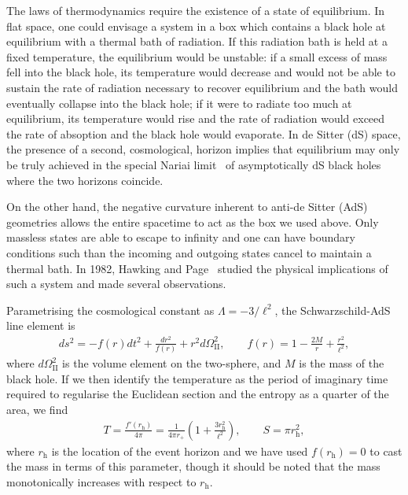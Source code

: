 \documentclass[
twoside,
openright,
frontopenright,
]{dmathesis}
\begin{document}
The laws of thermodynamics require the existence of a state of equilibrium. In
flat space, one could envisage a system in a box which contains a black hole at
equilibrium with a thermal bath of radiation. If this radiation bath is held at
a fixed temperature, the equilibrium would be unstable: if a small excess of
mass fell into the black hole, its temperature would decrease and would not be
able to sustain the rate of radiation necessary to recover equilibrium and the
bath would eventually collapse into the black hole; if it were to radiate too
much at equilibrium, its temperature would rise and the rate of radiation would
exceed the rate of absoption and the black hole would evaporate. In de Sitter
(dS) space, the presence of a second, cosmological, horizon implies that
equilibrium may only be truly achieved in the special Nariai
limit~\cite{Nariai:1950aa,Nariai:1951aa} of asymptotically dS black holes where
the two horizons coincide.

On the other hand, the negative curvature inherent to anti-de Sitter (AdS)
geometries allows the entire spacetime to act as the box we used above. Only
massless states are able to escape to infinity and one can have boundary
conditions such than the incoming and outgoing states cancel to maintain a
thermal bath. In 1982, Hawking and Page~\cite{Hawking:1982dh} studied the
physical implications of such a system and made several observations.

Parametrising the cosmological constant as $\Lambda = -3/\ell^2$, the
Schwarzschild-AdS line element is
\begin{gather}
  ds^2 = -f(r)dt^2 + \frac{dr^2}{f(r)} + r^2 d\Omega_{\mathrm{II}}^2, \qquad
  f(r) = 1-\frac{2M}{r}+\frac{r^2}{\ell^2},
  \label{eq:schwAdS}
\end{gather}
where $d\Omega_\mathrm{II}^2$ is the volume element on the two-sphere, and $M$
is the mass of the black hole. If we then identify the temperature as the period
of imaginary time required to regularise the Euclidean section and the entropy
as a quarter of the area, we find
\begin{align}
  T = \frac{f'(r_\mathrm{h})}{4\pi} = \frac{1}{4\pi
    r_+}\left(1+\frac{3r_\mathrm{h}^2}{\ell^2}\right), \qquad S = \pi r_\mathrm{h}^2,
\end{align}
where $r_\mathrm{h}$ is the location of the event horizon and we have used
$f(r_\mathrm{h})=0$ to cast the mass in terms of this parameter, though it
should be noted that the mass monotonically increases with respect to
$r_\mathrm{h}$.
\end{document}
